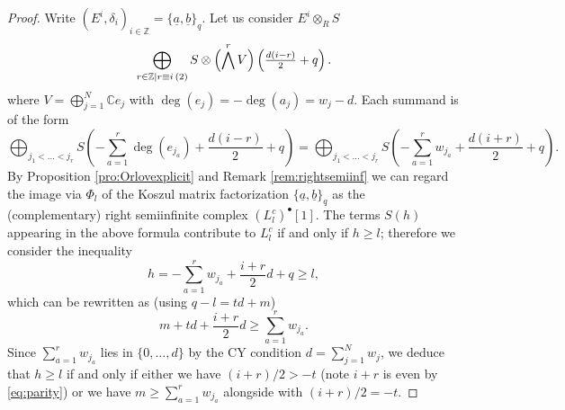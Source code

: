 \documentclass[11pt]{amsart}
\theoremstyle{definition} %
\theoremstyle{remark} %
\newcommand{\CC}{\mathbb C}
\newcommand{\ZZ}{\mathbb Z}
\newcommand{\ua}{\underline{a}}
\newcommand{\ub}{\underline{b}}
\begin{document}
\begin{proof}
Write $(E^i, \delta_i)_{i\in \ZZ} = \{\ua,\ub\}_q$. 
Let us consider $E^i\otimes_R S$
\begin{equation}
\label{eq:parity}
\bigoplus_{r\in \ZZ\mid r\equiv i\, (2)} 
S\otimes \Bigl(\bigwedge^{r} V \Bigr) 
\left(\textstyle \frac{d(i-r)}2+q\right). 
\end{equation}
where $V = \bigoplus_{j=1}^N \CC e_j$ with 
$\deg (e_j) = -\deg (a_j) = w_j -d$.  
Each summand is of the form 
\begin{equation}
\label{eq:terms}
\bigoplus_{{j_1<\dots<j_r}}
S\left( \textstyle - \sum_{a=1}^r \deg(e_{j_a}) + \frac{d(i-r)}2 +q \right) 
= \bigoplus_{{j_1<\dots<j_r}}
S\left(\textstyle -\sum_{a=1}^r w_{j_a}+\frac{d(i+r)}2 +q \right). 
\end{equation}
By Proposition \ref{pro:Orlovexplicit} and 
Remark \ref{rem:rightsemiinf} 
we can regard the image via $\Phi_l$ of 
the Koszul matrix factorization $\{\ua,\ub\}_q$ 
as the (complementary) right semiinfinite complex 
$(L_l^c)^{\bullet} [1]$. 
The terms $S(h)$ appearing in the above formula 
contribute to $L_l^c$ if and only if $h\ge l$; 
therefore we consider the inequality
\begin{equation*}
h=-\sum_{a=1}^r w_{j_a}+ \frac{i+r}{2}d + q \ge l, 
\end{equation*} 
which can be rewritten as (using $q- l = td +m$) 
\[
m +t d +  \frac{i+r}{2} d
\ge \sum_{a=1}^r w_{j_a}.
\]
Since $\sum_{a=1}^r w_{j_a}$ lies in $\{0,\dots,d\}$ 
by the CY condition $d=\sum_{j=1}^N w_j$,  
we deduce that $h\ge l$ 
if and only if either we have 
$(i+r)/2 > - t$ 
(note $i+r$ is even by \eqref{eq:parity}) 
or we have $m \ge \sum_{a=1}^r w_{j_a}$ 
alongside with $({i+r})/2 =-t$. 


\end{proof}
\end{document}
